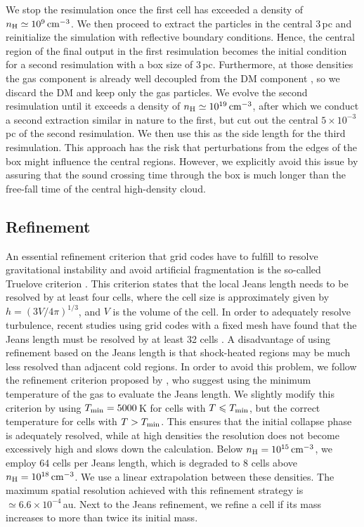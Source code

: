 \documentclass[useAMS,usenatbib]{mnras}
\newcommand{\cmmm}{\text{cm}^{-3}}
\newcommand{\nh}{n_{\rm H}}
\begin{document}
We stop the resimulation once the first cell has exceeded a density of $\nh \simeq 10^9\,\cmmm$. We then proceed to extract the particles in the central $3\,$pc and reinitialize the simulation with reflective boundary conditions. Hence, the central region of the final output in the first resimulation becomes the initial condition for a second resimulation with a box size of $3\,$pc. Furthermore, at those densities the gas component is already well decoupled from the DM component \citep{Greif_2011}, so we discard the DM and keep only the gas particles. We evolve the second resimulation until it exceeds a density of $\nh \simeq 10^{19}\,\cmmm$, after which we conduct a second extraction similar in nature to the first, but cut out the central $5\times 10^{-3}\,$pc of the second resimulation. We then use this as the side length for the third resimulation. This approach has the risk that perturbations from the edges of the box might influence the central regions. However, we explicitly avoid this issue by assuring that the sound crossing time through the box is much longer than the free-fall time of the central high-density cloud.

\subsection{Refinement}
\label{subsec:refinement}

An essential refinement criterion that grid codes have to fulfill to resolve gravitational instability and avoid artificial fragmentation is the so-called Truelove criterion \citep{Truelove_1997}. This criterion states that the local Jeans length needs to be resolved by at least four cells, where the cell size is approximately given by $h = (3V/4\pi)^{1/3}$, and $V$ is the volume of the cell. In order to adequately resolve turbulence, recent studies using grid codes with a fixed mesh have found that the Jeans length must be resolved by at least 32 cells \citep{Federrath_2011, Turk_2012, Latif_2013a}. A disadvantage of using refinement based on the Jeans length is that shock-heated regions may be much less resolved than adjacent cold regions. In order to avoid this problem, we follow the refinement criterion proposed by \citet{Turk_2010}, who suggest using the minimum temperature of the gas to evaluate the Jeans length. We slightly modify this criterion by using $T_{\rm min} = 5000\,$K for cells with $T \le T_{\rm min}$, but the correct temperature for cells with $T>T_{\rm min}$. This ensures that the initial collapse phase is adequately resolved, while at high densities the resolution does not become excessively high and slows down the calculation. Below $\nh=10^{15}\,\cmmm$, we employ 64 cells per Jeans length, which is degraded to 8 cells above $\nh=10^{18}\,\cmmm$. We use a linear extrapolation between these densities. The maximum spatial resolution achieved with this refinement strategy is $\simeq 6.6 \times 10^{-4}\,$au. Next to the Jeans refinement, we refine a cell if its mass increases to more than twice its initial mass.
\end{document}
